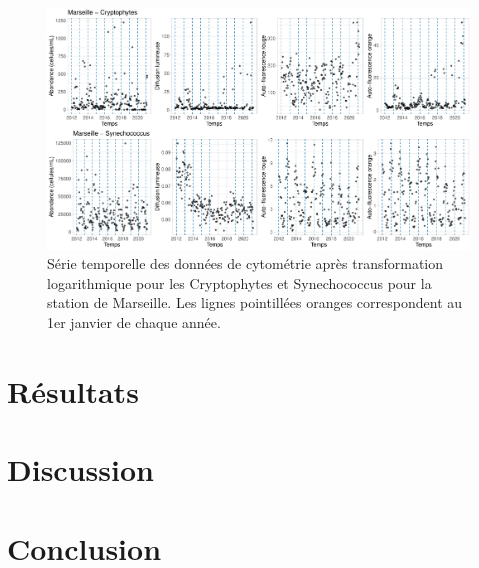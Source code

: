 \documentclass[12pt]{article}
\begin{document}
\begin{figure}
\centering
\includegraphics[width=\textwidth]{fig/MM_visualisation_ts_phyto.pdf}
\caption{Série temporelle des données de cytométrie après transformation logarithmique pour les Cryptophytes et Synechococcus pour la station de Marseille. Les lignes pointillées oranges correspondent au 1er janvier de chaque année.}
\end{figure}



\section{Résultats}



\section{Discussion}



\section{Conclusion}




\newpage
{}
\listoffigures

\listoftables

\newpage
\begin{appendices}

\end{appendices}


\begin{abstract}

\end{abstract}
\end{document}
